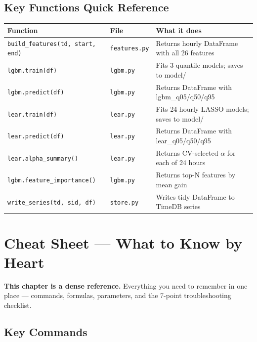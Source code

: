 \documentclass[12pt, a4paper, oneside]{memoir}
\newcommand{\code}[1]{\texttt{\footnotesize #1}}
\begin{document}
\section{Key Functions Quick Reference}

\begin{center}
\begin{tabularx}{\linewidth}{llX}
\toprule
\textbf{Function} & \textbf{File} & \textbf{What it does} \\
\midrule
\code{build\_features(td, start, end)} & \code{features.py} & Returns hourly DataFrame with all 26 features \\
\code{lgbm.train(df)} & \code{lgbm.py} & Fits 3 quantile models; saves to model/ \\
\code{lgbm.predict(df)} & \code{lgbm.py} & Returns DataFrame with lgbm\_q05/q50/q95 \\
\code{lear.train(df)} & \code{lear.py} & Fits 24 hourly LASSO models; saves to model/ \\
\code{lear.predict(df)} & \code{lear.py} & Returns DataFrame with lear\_q05/q50/q95 \\
\code{lear.alpha\_summary()} & \code{lear.py} & Returns CV-selected $\alpha$ for each of 24 hours \\
\code{lgbm.feature\_importance()} & \code{lgbm.py} & Returns top-N features by mean gain \\
\code{write\_series(td, sid, df)} & \code{store.py} & Writes tidy DataFrame to TimeDB series \\
\bottomrule
\end{tabularx}
\end{center}

\chapter{Cheat Sheet --- What to Know by Heart}\label{ch:cheatsheet}

\begin{chapterintro}
\sffamily\small\textbf{This chapter is a dense reference.} Everything you need to
remember in one place --- commands, formulas, parameters, and the 7-point
troubleshooting checklist.
\end{chapterintro}

\section{Key Commands}
\end{document}
